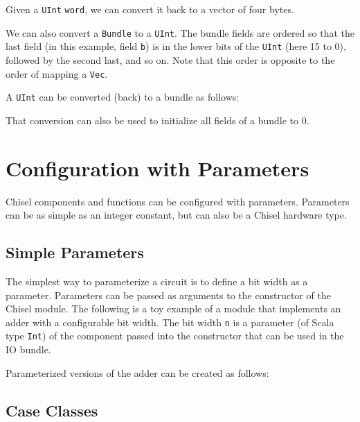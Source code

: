 \documentclass[%
    10pt,
    headinclude, footexclude,
    openright, %
    notitlepage,
    cleardoubleempty,
    headsepline,
    pointlessnumbers,
    bibtotoc, idxtotoc,
    ]{scrbook}
\newcommand{\code}[1]{{\lstinline[basicstyle=\small\ttfamily]{#1}}}
\begin{document}

\noindent Given a \code{UInt} \code{word}, we can convert it back to a vector
of four bytes.


We can also convert a \code{Bundle} to a \code{UInt}. The bundle fields are ordered
so that the last field (in this example, field \code{b}) is in the lower bits of the \code{UInt}
(here 15 to 0), followed by the second last, and so on. Note that this order is opposite to
the order of mapping a \code{Vec}.


\noindent A \code{UInt} can be converted (back) to a bundle as follows:


\noindent That conversion can also be used to initialize all fields of a bundle to 0.



\section{Configuration with Parameters}

Chisel components and functions can be configured with parameters.
Parameters can be as simple as an integer constant, but can also be a Chisel
hardware type.

\subsection{Simple Parameters}

The simplest way to parameterize a circuit is to define a bit width as a parameter.
Parameters can be passed as arguments to
the constructor of the Chisel module. The following is a toy example of
a module that implements an adder with a configurable bit width.
The bit width \code{n} is a parameter (of Scala type \code{Int}) of the component
passed into the constructor that can be used in the IO bundle.


\noindent Parameterized versions of the adder can be created as follows:


\subsection{Case Classes}
\end{document}

